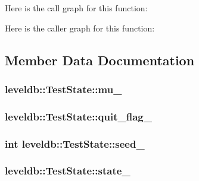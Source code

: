 Here is the call graph for this function\-:




Here is the caller graph for this function\-:




\subsection{Member Data Documentation}
\hypertarget{classleveldb_1_1_test_state_a52f2e84b88c3c8f7f958a2879dce5f59}{
\subsubsection[{mu\-\_\-}]{ leveldb\-::\-Test\-State\-::mu\-\_\-\hspace{0.3cm}{\ttfamily [private]}}}\label{classleveldb_1_1_test_state_a52f2e84b88c3c8f7f958a2879dce5f59}
\hypertarget{classleveldb_1_1_test_state_a04e07cf69866e925db3fafd5cf9fa23f}{
\subsubsection[{quit\-\_\-flag\-\_\-}]{ leveldb\-::\-Test\-State\-::quit\-\_\-flag\-\_\-}}\label{classleveldb_1_1_test_state_a04e07cf69866e925db3fafd5cf9fa23f}
\hypertarget{classleveldb_1_1_test_state_aa44f519b574945b0061c88df42fd4725}{
\subsubsection[{seed\-\_\-}]{\setlength{\rightskip}{0pt plus 5cm}int leveldb\-::\-Test\-State\-::seed\-\_\-}}\label{classleveldb_1_1_test_state_aa44f519b574945b0061c88df42fd4725}
\hypertarget{classleveldb_1_1_test_state_abfbcdedcb6b61445e42231a7d766dc3d}{
\subsubsection[{state\-\_\-}]{ leveldb\-::\-Test\-State\-::state\-\_\-\hspace{0.3cm}{\ttfamily [private]}}}\label{classleveldb_1_1_test_state_abfbcdedcb6b61445e42231a7d766dc3d}
